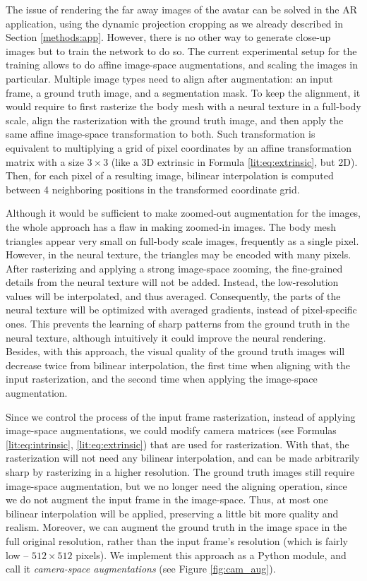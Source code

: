 The issue of rendering the far away images of the avatar can be solved in the AR application, using the dynamic projection cropping as we already described in Section \ref{methods:app}. However, there is no other way to generate close-up images but to train the network to do so. The current experimental setup for the training allows to do affine image-space augmentations, and scaling the images in particular. Multiple image types need to align after augmentation: an input frame, a ground truth image, and a segmentation mask. To keep the alignment, it would require to first rasterize the body mesh with a neural texture in a full-body scale, align the rasterization with the ground truth image, and then apply the same affine image-space transformation to both. Such transformation is equivalent to multiplying a grid of pixel coordinates by an affine transformation matrix with a size $3 \times 3$ (like a 3D extrinsic in Formula \ref{lit:eq:extrinsic}, but 2D). Then, for each pixel of a resulting image, bilinear interpolation is computed between 4 neighboring positions in the transformed coordinate grid. 

Although it would be sufficient to make zoomed-out augmentation for the images, the whole approach has a flaw in making zoomed-in images. The body mesh triangles appear very small on full-body scale images, frequently as a single pixel. However, in the neural texture, the triangles may be encoded with many pixels. After rasterizing and applying a strong image-space zooming, the fine-grained details from the neural texture will not be added. Instead, the low-resolution values will be interpolated, and thus averaged. Consequently, the parts of the neural texture will be optimized with averaged gradients, instead of pixel-specific ones. This prevents the learning of sharp patterns from the ground truth in the neural texture, although intuitively it could improve the neural rendering. Besides, with this approach, the visual quality of the ground truth images will decrease twice from bilinear interpolation, the first time when aligning with the input rasterization, and the second time when applying the image-space augmentation.

Since we control the process of the input frame rasterization, instead of applying image-space augmentations, we could modify camera matrices (see Formulas \ref{lit:eq:intrinsic}, \ref{lit:eq:extrinsic}) that are used for rasterization. With that, the rasterization will not need any bilinear interpolation, and can be made arbitrarily sharp by rasterizing in a higher resolution. The ground truth images still require image-space augmentation, but we no longer need the aligning operation, since we do not augment the input frame in the image-space. Thus, at most one bilinear interpolation will be applied, preserving a little bit more quality and realism. Moreover, we can augment the ground truth in the image space in the full original resolution, rather than the input frame's resolution (which is fairly low -- $512 \times 512$ pixels). We implement this approach as a Python module, and call it \textit{camera-space augmentations} (see Figure \ref{fig:cam_aug}).

